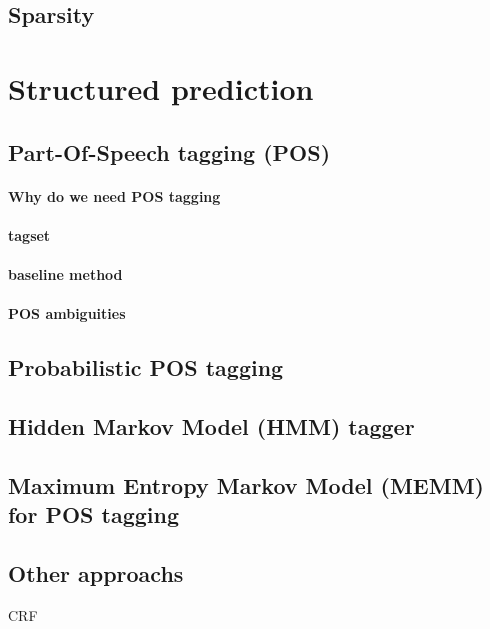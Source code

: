 		\subsection{Sparsity}

	\section{Structured prediction}

		\subsection{Part-Of-Speech tagging (POS)}

				\paragraph*{Why do we need POS tagging}

				\paragraph*{tagset}

				\paragraph*{baseline method}


				\paragraph*{POS ambiguities}
		\subsection{Probabilistic POS tagging}

		\subsection{Hidden Markov Model (HMM) tagger}

		\subsection{Maximum Entropy Markov Model (MEMM) for POS tagging}

		\subsection{Other approachs}
				CRF


